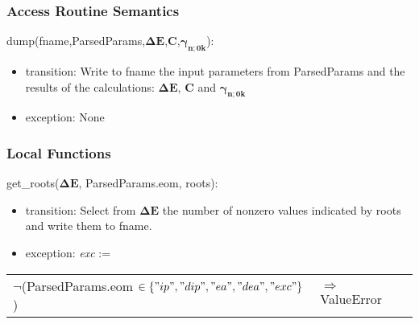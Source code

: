 \documentclass[12pt, titlepage]{article}
\begin{document}

\subsubsection{Access Routine Semantics}

\noindent dump(fname,ParsedParams,$\boldsymbol{\Delta 
E}$,$\boldsymbol{C}$,$\boldsymbol{\gamma_{n;0k}}$):
\begin{itemize}
	\item transition: Write to fname the input parameters from ParsedParams and 
	the results of the calculations: $\boldsymbol{\Delta 
		E}$, $\boldsymbol{C}$ and $\boldsymbol{\gamma_{n;0k}}$
	\item exception: None
\end{itemize}

%

\subsubsection{Local Functions}

\noindent get\_roots($\boldsymbol{\Delta E}$, ParsedParams.eom, 
roots):
\begin{itemize}
	\item transition: Select from $\boldsymbol{\Delta E}$ the number of nonzero 
	values indicated by roots and write them to fname.
	\item exception: \textit{exc} :=  
\end{itemize}
\noindent \begin{longtable*}[l]{l l}
$\neg$(ParsedParams.eom $\in \{"ip", "dip", "ea", "dea", "exc"\}$)  & 
$\Rightarrow$ ValueError
\end{longtable*} 
\end{document}
